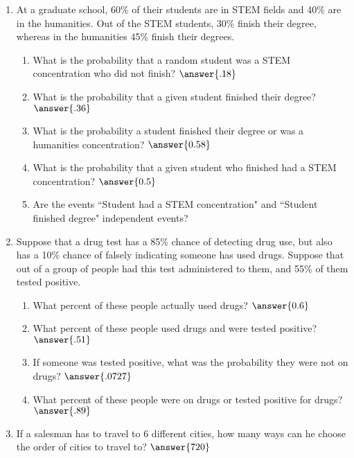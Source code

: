 \documentclass{ximera}
\begin{document}
\begin{enumerate}
\begin{enumerate}
\end{enumerate}



\item At a graduate school, 60\% of their students are in STEM fields and 40\% are in the humanities.  Out of the STEM students, 30\% finish their degree, whereas in the humanities 45\% finish their degrees.
\begin{enumerate}
\item What is the probability that a random student  was a STEM concentration who did not finish? $\answer{.18}$
\item What is the probability that a given student finished their degree? $\answer{.36}$
\item What is the probability a student finished their degree or was a humanities concentration? $\answer{0.58}$
\item What is the probability that a given student who finished had a STEM concentration? $\answer{0.5}$
\item Are the events ``Student had a STEM concentration" and ``Student finished degree" independent events?
\begin{multipleChoice}
\end{multipleChoice}

\end{enumerate}
\item Suppose that a drug test has a 85\% chance of detecting drug use, but also has a 10\% chance of falsely indicating someone has used drugs.  Suppose that out of a group of people had this test administered to them, and 55\% of them tested positive.
\begin{enumerate}
\item What percent of these people actually used drugs? $\answer{0.6}$
\item What percent of these people used drugs and were tested positive? $\answer{.51}$
\item If someone was tested positive, what was the probability they were not on drugs? $\answer{.0727}$
\item What percent of these people were on drugs or tested positive for drugs? $\answer{.89}$
\end{enumerate}


\item If a salesman has to travel to 6 different cities, how many ways can he choose the order of cities to travel to? $\answer{720}$



\end{enumerate}
\end{document}
